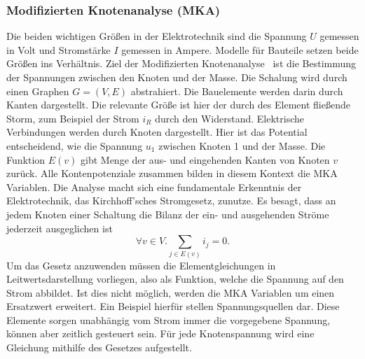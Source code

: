 
\subsubsection*{Modifizierten Knotenanalyse (MKA)}
Die beiden wichtigen Größen in der Elektrotechnik sind die Spannung $U$ gemessen in Volt und Stromstärke $I$ gemessen in Ampere. Modelle für Bauteile setzen beide Größen ins Verhältnis. Ziel der Modifizierten Knotenanalyse~\cite{Gunther:2005} ist die Bestimmung der Spannungen zwischen den Knoten und der Masse. Die Schalung wird durch einen Graphen \(G = (V,E)\) abstrahiert. Die Bauelemente werden darin durch Kanten dargestellt. Die relevante Größe ist hier der durch des Element fließende Storm, zum Beispiel der Strom \(i_R\) durch den Widerstand. Elektrische Verbindungen werden durch Knoten dargestellt. Hier ist das Potential entscheidend, wie die Spannung \(u_1\) zwischen Knoten 1 und der Masse. Die Funktion \(E(v)\) gibt Menge der aus- und eingehenden Kanten von Knoten \(v\) zurück. Alle Kontenpotenziale zusammen bilden in diesem Kontext die MKA Variablen. Die Analyse macht sich eine fundamentale Erkenntnis der Elektrotechnik, das Kirchhoff’sches Stromgesetz, zunutze. Es besagt, dass an jedem Knoten einer Schaltung die Bilanz der ein- und ausgehenden Ströme jederzeit ausgeglichen ist
\begin{displaymath}
    \forall v \in V. \sum_{j \in E(v)} i_{j} = 0.
\end{displaymath}
Um das Gesetz anzuwenden müssen die Elementgleichungen in Leitwertsdarstellung vorliegen, also als Funktion, welche die Spannung auf den Strom abbildet. Ist dies nicht möglich, werden die MKA Variablen um einen Ersatzwert erweitert. Ein Beispiel hierfür stellen Spannungsquellen dar. Diese Elemente sorgen unabhängig vom Strom immer die vorgegebene Spannung, können aber zeitlich gesteuert sein. Für jede Knotenspannung wird eine Gleichung mithilfe des Gesetzes aufgestellt.

